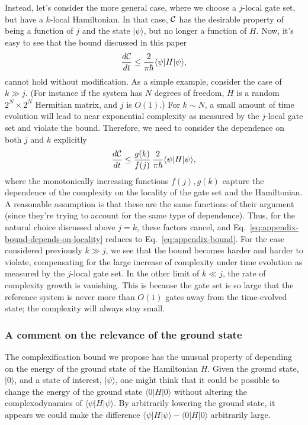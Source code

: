 \documentclass[12pt]{article}
\numberwithin{equation}{section}
\newcommand{\be}{\begin{equation}}
\newcommand{\ee}{\end{equation}}
\def\CC{{\cal C}}
\begin{document}
Instead, let's consider the more general case, where we choose a $j$-local gate set, but have a $k$-local Hamiltonian. In that case, $\CC$ has the desirable property of being a function of $j$ and the state $|\psi \rangle$, but no longer a function of $H$. Now, it's easy to see that the bound discussed in this paper
\be
\frac{d\CC}{dt} \le \frac{2 }{\pi \hbar}\langle \psi | H |\psi \rangle,\label{eq:appendix-bound}
\ee
cannot hold without modification. As a simple example, consider the case of $k \gg j$. (For instance if the system has $N$ degrees of freedom, $H$ is a random $2^N \times 2^N$ Hermitian matrix, and $j$ is $O(1)$.) For $k \sim N$, a small amount of time evolution will lead to near exponential complexity as measured by the $j$-local gate set and violate the bound. Therefore, we need to consider the dependence on both $j$ and $k$ explicitly
\be
 \frac{d\CC}{dt} \le \frac{g(k)}{f(j)}\, \frac{2 }{\pi \hbar}\langle \psi | H |\psi \rangle ,\label{eq:appendix-bound-depends-on-locality}
\ee
where the monotonically increasing functions $f(j), g(k)$ capture the dependence of the complexity on the locality of the gate set and the Hamiltonian. A reasonable assumption is that these are the same functions of their argument (since they're trying to account for the same type of dependence). Thus, for the natural choice discussed above $j=k$, these factors cancel, and Eq.~\ref{eq:appendix-bound-depends-on-locality} reduces to Eq.~\ref{eq:appendix-bound}. For the case considered previously $k \gg j$, we see that the bound becomes harder and harder to violate, compensating for the large increase of complexity under time evolution as measured by the $j$-local gate set. In the other limit of $k \ll j$, the rate of complexity growth is vanishing. This is because the gate set is so large that the reference system is never more than $O(1)$ gates away from the time-evolved state; the complexity will always stay small.

\subsubsection*{A comment on the relevance of the ground state}
The complexification bound we propose has the unusual property of depending on the energy of the ground state of the Hamiltonian $H$. Given the ground state, $|0\rangle$, and a state of interest, $|\psi\rangle$, one might think that it could be possible to change the energy of the ground state $\langle 0 | H |0 \rangle$ without altering the complexodynamics of  $\langle \psi | H | \psi\rangle$. By arbitrarily lowering the ground state, it appears we could make the difference $\langle \psi | H | \psi\rangle - \langle 0 | H | 0 \rangle$ arbitrarily large.
\end{document}

